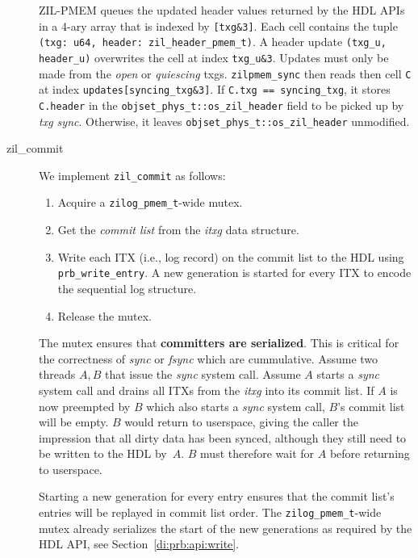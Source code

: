 \documentclass[12pt,a4paper,twoside]{book}
\begin{document}
\begin{description}
        ZIL-PMEM queues the updated header values returned by the HDL APIs in a 4-ary array that is indexed by \lstinline{[txg&3]}.
        Each cell contains the tuple \lstinline{(txg: u64, header: zil_header_pmem_t)}.
        A header update \lstinline{(txg_u, header_u)} overwrites the cell at index \lstinline{txg_u&3}.
        Updates must only be made from the \textit{open} or \textit{quiescing} txgs.
        \lstinline{zilpmem_sync} then reads then cell \lstinline{C} at index \lstinline{updates[syncing_txg&3]}.
        If \lstinline{C.txg == syncing_txg}, it stores \lstinline{C.header} in the \lstinline{objset_phys_t::os_zil_header} field to be picked up by \textit{txg sync}.
        Otherwise, it leaves \lstinline{objset_phys_t::os_zil_header} unmodified.

    \item[zil\_commit]
        We implement \lstinline{zil_commit} as follows:
        \begin{enumerate}[noitemsep]
            \item Acquire a \lstinline{zilog_pmem_t}-wide mutex.
            \item Get the \textit{commit list} from the \textit{itxg} data structure.
            \item Write each ITX (i.e., log record) on the commit list to the HDL using \lstinline{prb_write_entry}.
                A new generation is started for every ITX to encode the sequential log structure.
            \item Release the mutex.
        \end{enumerate}
        The mutex ensures that \textbf{committers are serialized}.
        This is critical for the correctness of \textit{sync} or \textit{fsync} which are cummulative.
        Assume two threads $A, B$ that issue the \textit{sync} system call.
        Assume $A$ starts a \textit{sync} system call and drains all ITXs from the \textit{itxg} into its commit list.
        If $A$ is now preempted by $B$ which also starts a \textit{sync} system call, $B$'s commit list will be empty.
        $B$ would return to userspace, giving the caller the impression that all dirty data has been synced, although they still need to be written to the HDL by~$A$.
        $B$ must therefore wait for $A$ before returning to userspace.

        Starting a new generation for every entry ensures that the commit list's entries will be replayed in commit list order.
        The \lstinline{zilog_pmem_t}-wide mutex already serializes the start of the new generations as required by the HDL API, see Section~\ref{di:prb:api:write}.


\end{description}
\end{document}
